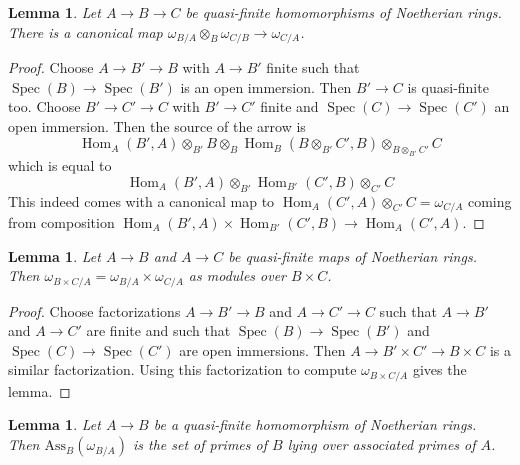 \documentclass{stacks-project}
\theoremstyle{plain}
\newtheorem{lemma}[subsection]{Lemma}
\theoremstyle{definition}
\theoremstyle{remark}
\numberwithin{equation}{subsection}
\def\Spec{\mathop{\mathrm{Spec}}}
\def\Hom{\mathop{\mathrm{Hom}}\nolimits}
\begin{document}
\begin{lemma}
\label{lemma-dualizing-composition}
Let $A \to B \to C$ be quasi-finite homomorphisms of Noetherian rings.
There is a canonical map
$\omega_{B/A} \otimes_B \omega_{C/B} \to \omega_{C/A}$.
\end{lemma}

\begin{proof}
Choose $A \to B' \to B$ with $A \to B'$ finite such that
$\Spec(B) \to \Spec(B')$ is an open immersion. Then
$B' \to C$ is quasi-finite too. Choose $B' \to C' \to C$
with $B' \to C'$ finite and $\Spec(C) \to \Spec(C')$ an
open immersion. Then the source of the arrow is
$$
\Hom_A(B', A) \otimes_{B'} B \otimes_B
\Hom_B(B \otimes_{B'} C', B) \otimes_{B \otimes_{B'} C'} C
$$
which is equal to
$$
\Hom_A(B', A) \otimes_{B'}
\Hom_{B'}(C', B) \otimes_{C'} C
$$
This indeed comes with a canonical map to
$\Hom_A(C', A) \otimes_{C'} C = \omega_{C/A}$
coming from composition
$\Hom_A(B', A) \times \Hom_{B'}(C', B) \to \Hom_A(C', A)$.
\end{proof}

\begin{lemma}
\label{lemma-dualizing-product}
Let $A \to B$ and $A \to C$ be quasi-finite maps of Noetherian rings.
Then $\omega_{B \times C/A} = \omega_{B/A} \times \omega_{C/A}$
as modules over $B \times C$.
\end{lemma}

\begin{proof}
Choose factorizations $A \to B' \to B$ and $A \to C' \to C$ such that
$A \to B'$ and $A \to C'$ are finite and such that $\Spec(B) \to \Spec(B')$
and $\Spec(C) \to \Spec(C')$ are open immersions. Then
$A \to B' \times C' \to B \times C$ is a similar factorization.
Using this factorization to compute $\omega_{B \times C/A}$
gives the lemma.
\end{proof}

\begin{lemma}
\label{lemma-dualizing-associated-primes}
Let $A \to B$ be a quasi-finite homomorphism of Noetherian rings.
Then $\text{Ass}_B(\omega_{B/A})$ is the set of primes of $B$
lying over associated primes of $A$.
\end{lemma}
\end{document}

